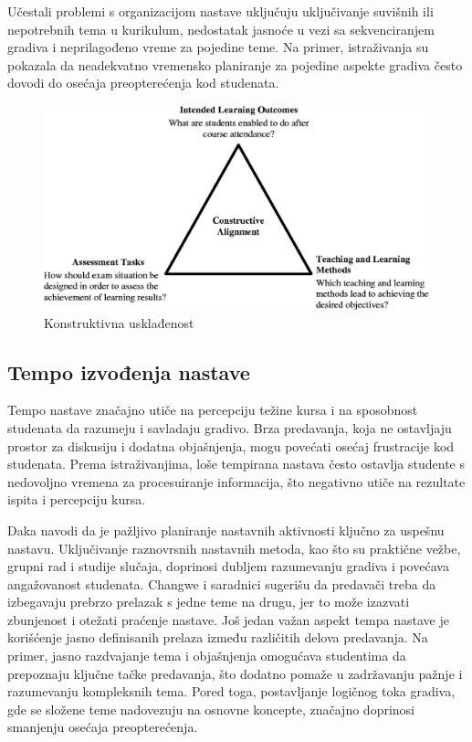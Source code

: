 \documentclass[a4paper]{article}
\begin{document}
Učestali problemi s organizacijom nastave uključuju uključivanje suvišnih ili nepotrebnih
tema u kurikulum, nedostatak jasnoće u vezi sa sekvenciranjem gradiva i neprilagođeno
vreme za pojedine teme. Na primer, istraživanja su pokazala da neadekvatno vremensko
planiranje za pojedine aspekte gradiva često dovodi do osećaja preopterećenja kod
studenata.

\begin{figure}[h!]
\begin{center}
\includegraphics[scale=2]{constructive_alignment.jpeg}
\end{center}
\caption{Konstruktivna usklađenost}
\label{fig:konstruktivna_uskladjenost}
\end{figure}

\subsection{Tempo izvođenja nastave}
Tempo nastave značajno utiče na percepciju težine kursa i na sposobnost studenata da
razumeju i savladaju gradivo. Brza predavanja, koja ne ostavljaju prostor za diskusiju i
dodatna objašnjenja, mogu povećati osećaj frustracije kod studenata. Prema istraživanjima,
loše tempirana nastava često ostavlja studente s nedovoljno vremena za procesuiranje
informacija, što negativno utiče na rezultate ispita i percepciju kursa.

Daka \cite{daka2020exploration} navodi da je pažljivo planiranje nastavnih aktivnosti ključno za uspešnu
nastavu. Uključivanje raznovrsnih nastavnih metoda, kao što su praktične vežbe, grupni rad i
studije slučaja, doprinosi dubljem razumevanju gradiva i povećava angažovanost studenata.
Changwe i saradnici \cite{daka2020exploration} sugerišu da predavači treba da izbegavaju prebrzo prelazak s
jedne teme na drugu, jer to može izazvati zbunjenost i otežati praćenje nastave.
Još jedan važan aspekt tempa nastave je korišćenje jasno definisanih prelaza između
različitih delova predavanja. Na primer, jasno razdvajanje tema i objašnjenja omogućava
studentima da prepoznaju ključne tačke predavanja, što dodatno pomaže u zadržavanju
pažnje i razumevanju kompleksnih tema. Pored toga, postavljanje logičnog toka gradiva, gde
se složene teme nadovezuju na osnovne koncepte, značajno doprinosi smanjenju osećaja
preopterećenja.
\end{document}
